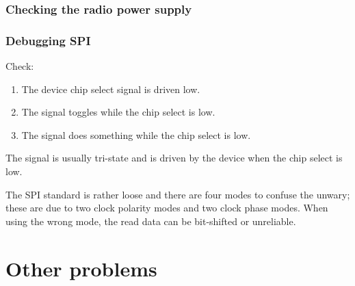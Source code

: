 \subsubsection{Checking the radio power supply}
\label{checking-the-radio-power-supply}


\subsubsection{Debugging SPI}
\label{debugging-spi}

Check:
%
\begin{enumerate}
\item The device chip select signal is driven low.
\item The  signal toggles while the chip select is low.
\item The  signal does something while the chip select is low.
\end{enumerate}
%
The  signal is usually tri-state and is driven by the
device when the chip select is low.

The SPI standard is rather loose and there are four modes to confuse
the unwary; these are due to two clock polarity modes and two clock
phase modes.  When using the wrong mode, the read data can be
bit-shifted or unreliable.


\section{Other problems}
\label{faq}

